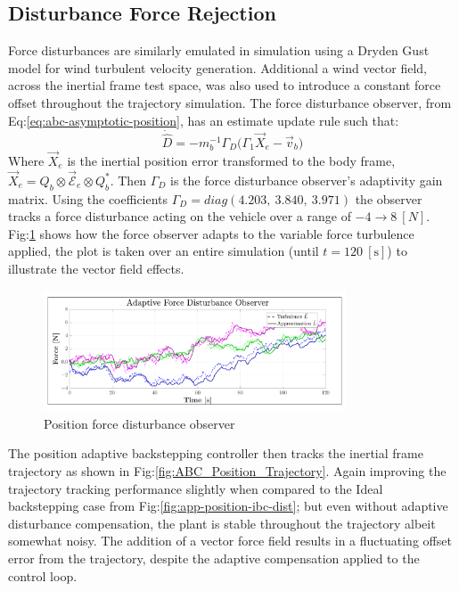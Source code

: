 \subsection{Disturbance Force Rejection}
\label{subsec:simulation.disturbance.force}
Force disturbances are similarly emulated in simulation using a Dryden Gust model for wind turbulent velocity generation. Additional a wind vector field, across the inertial frame test space, was also used to introduce a constant force offset throughout the trajectory simulation. The force disturbance observer, from Eq:\ref{eq:abc-asymptotic-position}, has an estimate update rule such that:
\begin{equation}
\dot{\hat{D}}=-m_b^{-1}\Gamma_D\Big(\Gamma_1\vec{X}_e-\vec{v}_b\Big)
\end{equation}
Where $\vec{X}_e$ is the inertial position error transformed to the body frame, $\vec{X}_e=Q_b\otimes\vec{\mathcal{E}}_e\otimes Q_b^*$. Then $\Gamma_D$ is the force disturbance observer's adaptivity gain matrix. Using the coefficients $\Gamma_D=diag(4.203,~3.840,~3.971)$ the observer tracks a force disturbance acting on the vehicle over a range of $-4\rightarrow 8~[N]$. Fig:\ref{fig:force-observer} shows how the force observer adapts to the variable force turbulence applied, the plot is taken over an entire simulation (until $t=120~[\text{s}]$) to illustrate the vector field effects.
\begin{figure}[hbtp]
\vspace{-6pt}
\centering
\includegraphics[width=0.8\textwidth]{graphs/force-observer}
\vspace{-12pt}
\caption{Position force disturbance observer}
\label{fig:force-observer}
\vspace{-16pt}
\end{figure}
\par
The position adaptive backstepping controller then tracks the inertial frame trajectory as shown in Fig:\ref{fig:ABC_Position_Trajectory}. Again improving the trajectory tracking performance slightly when compared to the Ideal backstepping case from Fig:\ref{fig:app-position-ibc-dist}; but even without adaptive disturbance compensation, the plant is stable throughout the trajectory albeit somewhat noisy. The addition of a vector force field results in a fluctuating offset error from the trajectory, despite the adaptive compensation applied to the control loop.
